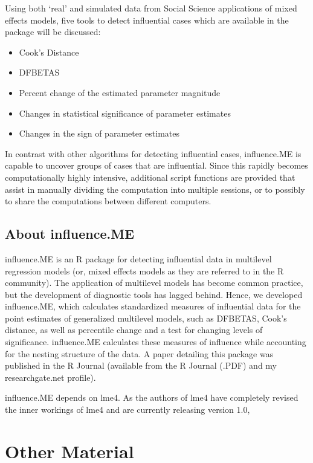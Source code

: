 \documentclass[12pt, a4paper]{article}
\begin{document}
Using both ‘real’ and simulated data from Social Science applications of mixed effects models, five tools to
detect influential cases which are available in the package will be discussed:
\begin{itemize}
	\item Cook’s Distance
	\item DFBETAS
	\item Percent change of the estimated parameter magnitude
	\item Changes in statistical significance of parameter estimates
	\item Changes in the sign of parameter estimates
\end{itemize}
In contrast with other algorithms for detecting influential cases, influence.ME is capable to uncover
groups of cases that are influential. Since this rapidly becomes computationally highly intensive, additional
script functions are provided that assist in manually dividing the computation into multiple sessions, or to
possibly to share the computations between different computers.

\subsection{About influence.ME}
influence.ME is an R package for detecting influential data in multilevel regression models (or, mixed effects models as they are referred to in the R community). The application of multilevel models has become common practice, but the development of diagnostic tools has lagged behind. Hence, we developed influence.ME, which calculates standardized measures of influential data for the point estimates of generalized multilevel models, such as DFBETAS, Cook’s distance, as well as percentile change and a test for changing levels of significance. influence.ME calculates these measures of influence while accounting for the nesting structure of the data. A paper detailing this package was published in the R Journal (available from the R Journal (.PDF) and my researchgate.net profile).

influence.ME depends on lme4. As the authors of lme4 have completely revised the inner workings of lme4 and are currently releasing version 1.0, 



\section*{Other Material}
\end{document}
